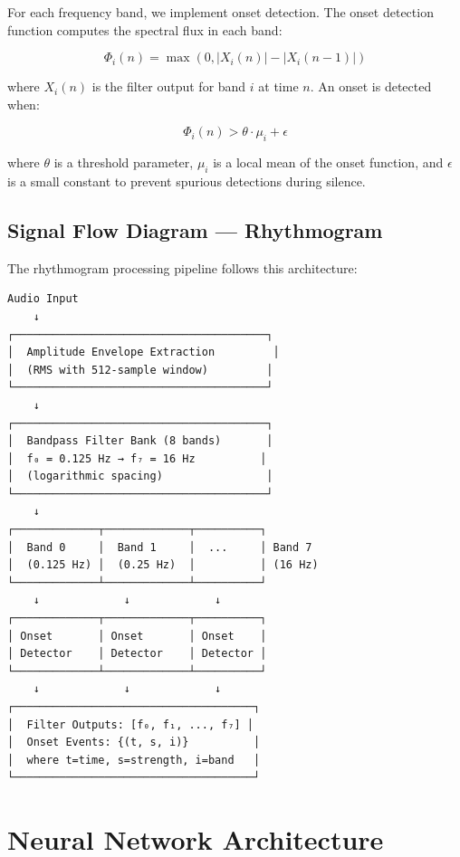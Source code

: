 \documentclass[11pt,a4paper]{article}
\begin{document}
For each frequency band, we implement onset detection. The onset detection function computes the spectral flux in each band:

\begin{equation}
\Phi_i(n) = \max(0, |X_i(n)| - |X_i(n-1)|)
\end{equation}

\noindent where $X_i(n)$ is the filter output for band $i$ at time $n$. An onset is detected when:

\begin{equation}
\Phi_i(n) > \theta \cdot \mu_i + \epsilon
\end{equation}

\noindent where $\theta$ is a threshold parameter, $\mu_i$ is a local mean of the onset function, and $\epsilon$ is a small constant to prevent spurious detections during silence.

\subsection{Signal Flow Diagram --- Rhythmogram}

The rhythmogram processing pipeline follows this architecture:

\begin{verbatim}
Audio Input
    ↓
┌───────────────────────────────────────┐
│  Amplitude Envelope Extraction         │
│  (RMS with 512-sample window)         │
└───────────────────────────────────────┘
    ↓
┌───────────────────────────────────────┐
│  Bandpass Filter Bank (8 bands)       │
│  f₀ = 0.125 Hz → f₇ = 16 Hz          │
│  (logarithmic spacing)                │
└───────────────────────────────────────┘
    ↓
┌─────────────┬─────────────┬──────────┐
│  Band 0     │  Band 1     │  ...     │ Band 7
│  (0.125 Hz) │  (0.25 Hz)  │          │ (16 Hz)
└─────────────┴─────────────┴──────────┘
    ↓             ↓             ↓
┌─────────────┬─────────────┬──────────┐
│ Onset       │ Onset       │ Onset    │
│ Detector    │ Detector    │ Detector │
└─────────────┴─────────────┴──────────┘
    ↓             ↓             ↓
┌─────────────────────────────────────┐
│  Filter Outputs: [f₀, f₁, ..., f₇] │
│  Onset Events: {(t, s, i)}          │
│  where t=time, s=strength, i=band   │
└─────────────────────────────────────┘
\end{verbatim}

\section{Neural Network Architecture}
\end{document}
